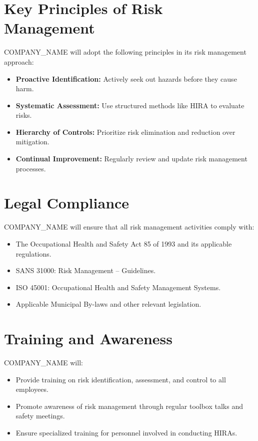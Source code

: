 \documentclass[12pt]{article}
\begin{document}
\section{Key Principles of Risk Management}
{{COMPANY_NAME}} will adopt the following principles in its risk management approach:
\begin{itemize}
    \item \textbf{Proactive Identification:} Actively seek out hazards before they cause harm.
    \item \textbf{Systematic Assessment:} Use structured methods like HIRA to evaluate risks.
    \item \textbf{Hierarchy of Controls:} Prioritize risk elimination and reduction over mitigation.
    \item \textbf{Continual Improvement:} Regularly review and update risk management processes.
\end{itemize}

\section{Legal Compliance}
{{COMPANY_NAME}} will ensure that all risk management activities comply with:
\begin{itemize}
    \item The Occupational Health and Safety Act 85 of 1993 and its applicable regulations.
    \item SANS 31000: Risk Management – Guidelines.
    \item ISO 45001: Occupational Health and Safety Management Systems.
    \item Applicable Municipal By-laws and other relevant legislation.
\end{itemize}

\section{Training and Awareness}
{{COMPANY_NAME}} will:
\begin{itemize}
    \item Provide training on risk identification, assessment, and control to all employees.
    \item Promote awareness of risk management through regular toolbox talks and safety meetings.
    \item Ensure specialized training for personnel involved in conducting HIRAs.
\end{itemize}
\end{document}
